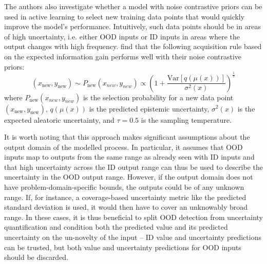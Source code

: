 The authors also investigate whether a model with noise contrastive priors can be used in active learning to select new training data points that would quickly improve the model's performance. Intuitively, such data points should be in areas of high uncertainty, i.e. either OOD inputs or ID inputs in areas where the output changes with high frequency. \citeauthor{noise-contrastive-uq-2020} find that the following acquisition rule based on the expected information gain performs well with their noise contrastive priors:
\begin{equation*}
    (x_\text{new}, y_\text{new}) \sim P_\text{new}(x_{new}, y_{new}) \propto \left( 1 + \frac{\text{Var}[q(\mu(x))]}{\sigma^2(x)} \right)^{\frac{1}{\tau}}
\end{equation*}
where $P_\text{new}(x_{new}, y_{new})$ is the selection probability for a new data point $(x_\text{new}, y_\text{new})$, $q(\mu(x))$ is the predicted epistemic uncertainty, $\sigma^2(x)$ is the expected aleatoric uncertainty, and $\tau = 0.5$ is the sampling temperature.

\newpar It is worth noting that this approach makes significant assumptions about the output domain of the modelled process. In particular, it assumes that OOD inputs map to outputs from the same range as already seen with ID inputs and that high uncertainty across the ID output range can thus be used to describe the uncertainty in the OOD output range. However, if the output domain does not have problem-domain-specific bounds, the outputs could be of any unknown range. If, for instance, a coverage-based uncertainty metric like the predicted standard deviation is used, it would then have to cover an unknowably broad range. In these cases, it is thus beneficial to split OOD detection from uncertainty quantification and condition both the predicted value and its predicted uncertainty on the un-novelty of the input -- ID value and uncertainty predictions can be trusted, but both value and uncertainty predictions for OOD inputs should be discarded.
